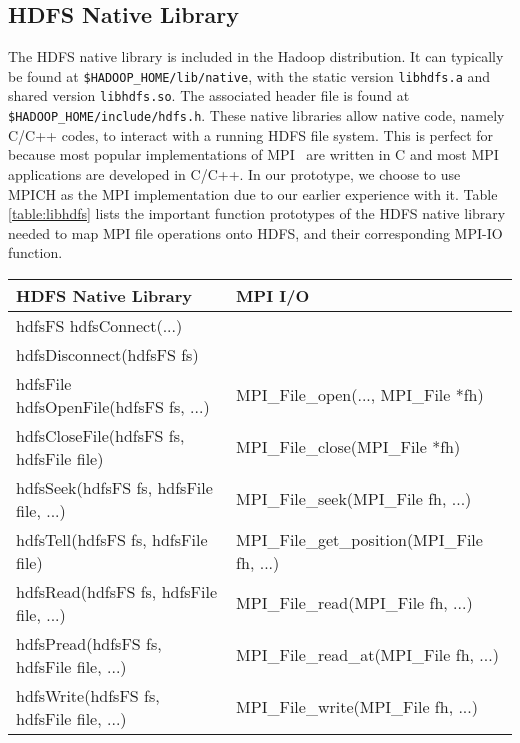 \subsection{HDFS Native Library}
The HDFS native library is included in the Hadoop distribution. It can typically
be found at \texttt{\$HADOOP\_HOME/lib/native}, with the static version
\texttt{libhdfs.a} and shared version \texttt{libhdfs.so}. The associated header
file is found at \texttt{\$HADOOP\_HOME/include/hdfs.h}. These native libraries
allow native code, namely C/C++ codes, to interact with a running HDFS file system. This is perfect for
{\proj} because most popular implementations of MPI~\cite{mpich, openmpi} are written in C and most
MPI applications are developed in C/C++. In our prototype, we choose to use
MPICH as the MPI implementation due to our earlier experience with it.
Table \ref{table:libhdfs} lists the important function prototypes of the HDFS native library needed to map
MPI file operations onto HDFS, and their corresponding MPI-IO function.

\begin{table*}[ht]
\center
\caption{Key HDFS Native Functions and their MPI Equivalents}
{\ttfamily
\begin{tabular}{l l}
\hline
HDFS Native Library & MPI I/O \\
\hline
hdfsFS hdfsConnect(...) & \\
hdfsDisconnect(hdfsFS fs) & \\
hdfsFile hdfsOpenFile(hdfsFS fs, ...) & MPI\_File\_open(..., MPI\_File *fh) \\
hdfsCloseFile(hdfsFS fs, hdfsFile file) & MPI\_File\_close(MPI\_File *fh) \\
hdfsSeek(hdfsFS fs, hdfsFile file, ...) & MPI\_File\_seek(MPI\_File fh, ...)\\
hdfsTell(hdfsFS fs, hdfsFile file) & MPI\_File\_get\_position(MPI\_File fh, ...)\\
hdfsRead(hdfsFS fs, hdfsFile file, ...) & MPI\_File\_read(MPI\_File fh, ...)\\
hdfsPread(hdfsFS fs, hdfsFile file, ...) & MPI\_File\_read\_at(MPI\_File fh, ...)\\
hdfsWrite(hdfsFS fs, hdfsFile file, ...) & MPI\_File\_write(MPI\_File fh, ...)\\
\hline
\end{tabular}
}
\label{table:libhdfs}
\end{table*}
					
